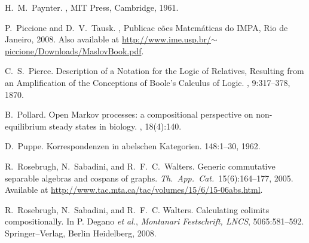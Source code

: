 \begin{thebibliography}{RSW00}

    H.\ M.\ Paynter.
    , MIT Press, Cambridge, 1961.


    P.\ Piccione and D.\ V.\ Tausk.
    , Publicac c\~oes Matem\'aticas do
    IMPA, Rio de Janeiro, 2008.
    \newblock Also available at
    \href{http://www.ime.usp.br/~piccione/Downloads/MaslovBook.pdf}
    {http://www.ime.usp.br/$\sim$piccione/Downloads/MaslovBook.pdf}.

    C.\ S.\ Pierce.
    \newblock Description of a Notation for the Logic of Relatives, Resulting
    from an Amplification of the Conceptions of Boole's Calculus of Logic.
    ,
    9:317--378, 1870. 


    B.\ Pollard.
    \newblock Open Markov processes: a compositional
    perspective on non-equilibrium steady states in biology.
    , 18(4):140.

    D.\ Puppe.
    \newblock Korrespondenzen in abelschen Kategorien.
     148:1--30, 1962.

    R.\ Rosebrugh, N.\ Sabadini, and R.\ F.\ C.\ Walters.
    \newblock Generic
    commutative separable algebras and cospans of graphs.
    \newblock \textsl{Th.\ App.\
    Cat.\ }15(6):164--177, 2005.
    \newblock Available at
    \href{http://www.tac.mta.ca/tac/volumes/15/6/15-06abs.html}{http://www.tac.mta.ca/tac/volumes/15/6/15-06abs.html}.

    R.\ Rosebrugh, N.\ Sabadini, and R.\ F.\ C. Walters.
    \newblock Calculating colimits compositionally.
    \newblock In P. Degano \textit{et al.}, \emph{Montanari Festschrift, LNCS}, { 5065}:581--592. Springer--Verlag, Berlin Heidelberg, 2008.


\end{thebibliography}
